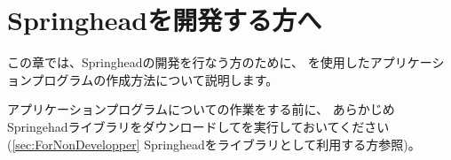 \newpage
\section{Springheadを開発する方へ}
\label{sec:ForDevelopper}

\noindent
この章では、Springheadの開発を行なう方のために、
\cmake を使用したアプリケーションプログラムの作成方法について説明します。

\medskip
\noindent
アプリケーションプログラムについての作業をする前に、
あらかじめSpringehadライブラリをダウンロードして\cmake を実行しておいてください
(\KQuoteS\ref{sec:ForNonDevelopper} Springheadをライブラリとして利用する方\KQuoteE 参照)。


